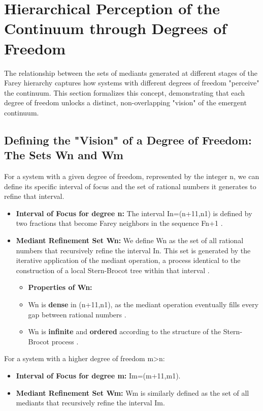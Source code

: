 \documentclass[12pt,a4paper]{article}
\theoremstyle{definition}
\theoremstyle{remark}
\begin{document}
\section{Hierarchical Perception of the Continuum through Degrees of Freedom}
The relationship between the sets of mediants generated at different stages of the Farey hierarchy captures how systems with different degrees of freedom "perceive" the continuum. This section formalizes this concept, demonstrating that each degree of freedom unlocks a distinct, non-overlapping "vision" of the emergent continuum.
\subsection{Defining the "Vision" of a Degree of Freedom: The Sets Wn​ and Wm​}
For a system with a given degree of freedom, represented by the integer n, we can define its specific interval of focus and the set of rational numbers it generates to refine that interval.
\begin{itemize}
\item \textbf{Interval of Focus for degree n:} The interval In​=(n+11​,n1​) is defined by two fractions that become Farey neighbors in the sequence Fn+1​ \cite{Zukin2016}.
\item \textbf{Mediant Refinement Set Wn​:} We define Wn​ as the set of all rational numbers that recursively refine the interval In​. This set is generated by the iterative application of the mediant operation, a process identical to the construction of a local Stern-Brocot tree within that interval \cite{Zukin2016, NumberanalyticsFarey}.
\begin{itemize}
\item \textbf{Properties of Wn​:}
\item Wn​ is \textbf{dense} in (n+11​,n1​), as the mediant operation eventually fills every gap between rational numbers \cite{DUMMIT}.
\item Wn​ is \textbf{infinite} and \textbf{ordered} according to the structure of the Stern-Brocot process \cite{WikipediaSternBrocot, CPAlgorithmsSternBrocot}.
\end{itemize}
\end{itemize}
For a system with a higher degree of freedom m>n:
\begin{itemize}
\item \textbf{Interval of Focus for degree m:} Im​=(m+11​,m1​).
\item \textbf{Mediant Refinement Set Wm​:} Wm​ is similarly defined as the set of all mediants that recursively refine the interval Im​.
\end{itemize}
\end{document}
